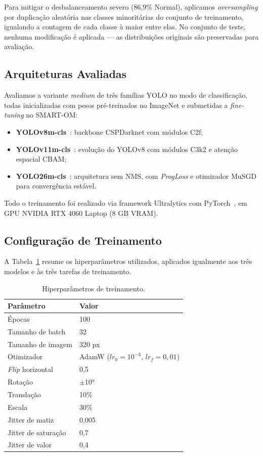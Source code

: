 \documentclass[12pt]{article}
\begin{document}
Para mitigar o desbalanceamento severo (86,9\% Normal), aplicamos
\textit{oversampling} por duplicação aleatória nas classes minoritárias
do conjunto de treinamento, igualando a contagem de cada classe à maior
entre elas.
No conjunto de teste, nenhuma modificação é aplicada — as distribuições
originais são preservadas para avaliação.

\subsection{Arquiteturas Avaliadas}

Avaliamos a variante \textit{medium} de três famílias YOLO no modo de
classificação, todas inicializadas com pesos pré-treinados no
ImageNet e submetidas a \textit{fine-tuning} no SMART-OM:

\begin{itemize}
  \item \textbf{YOLOv8m-cls}~\cite{yolov8}: backbone CSPDarknet com
    módulos C2f;
  \item \textbf{YOLOv11m-cls}~\cite{yolo11}: evolução do YOLOv8 com
    módulos C3k2 e atenção espacial CBAM;
  \item \textbf{YOLO26m-cls}~\cite{yolo26}: arquitetura sem NMS,
    com \textit{ProgLoss} e otimizador MuSGD para convergência estável.
\end{itemize}

Todo o treinamento foi realizado via framework Ultralytics com
PyTorch~\cite{yolov8}, em GPU NVIDIA RTX 4060 Laptop (8 GB VRAM).

\subsection{Configuração de Treinamento}

A Tabela~\ref{tab:hiperparametros} resume os hiperparâmetros utilizados,
aplicados igualmente aos três modelos e às três tarefas de treinamento.

\begin{table}[ht]
  \centering
  \caption{Hiperparâmetros de treinamento.}
  \label{tab:hiperparametros}
  \begin{tabular}{ll}
    \toprule
    Parâmetro & Valor \\
    \midrule
    Épocas              & 100 \\
    Tamanho de batch    & 32 \\
    Tamanho de imagem   & 320 px \\
    Otimizador          & AdamW ($lr_0 = 10^{-3}$, $lr_f = 0{,}01$) \\
    \textit{Flip} horizontal & 0,5 \\
    Rotação             & $\pm$10° \\
    Translação          & 10\% \\
    Escala              & 30\% \\
    Jitter de matiz     & 0,005 \\
    Jitter de saturação & 0,7 \\
    Jitter de valor     & 0,4 \\
    \bottomrule
  \end{tabular}
\end{table}
\end{document}
